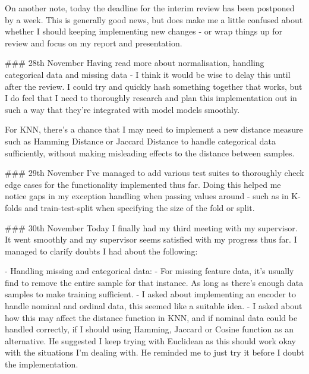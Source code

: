 \documentclass[letterpaper,10pt]{article}
\begin{document}
\begin{markdown}
On another note, today the deadline for the interim review has been postponed by a week. This is generally good news, but does make me a little confused about whether I should keeping implementing new changes - or wrap things up for review and focus on my report and presentation.

### 28th November
Having read more about normalisation, handling categorical data and missing data - I think it would be wise to delay this until after the review. I could try and quickly hash something together that works, but I do feel that I need to thoroughly research and plan this implementation out in such a way that they're integrated with model models smoothly.  
  
For KNN, there's a chance that I may need to implement a new distance measure such as Hamming Distance or Jaccard Distance to handle categorical data sufficiently, without making misleading effects to the distance between samples. 

### 29th November 
I've managed to add various test suites to thoroughly check edge cases for the functionality implemented thus far. Doing this helped me notice gaps in my exception handling when passing values around - such as in K-folds and train-test-split when specifying the size of the fold or split. 

### 30th November
Today I finally had my third meeting with my supervisor. It went smoothly and my supervisor seems satisfied with my progress thus far. I managed to clarify doubts I had about the following:  
  
- Handling missing and categorical data:
    - For missing feature data, it's usually find to remove the entire sample for that instance. As long as there's enough data samples to make training sufficient.  
     - I asked about implementing an encoder to handle nominal and ordinal data, this seemed like a suitable idea.  
    - I asked about how this may affect the distance function in KNN, and if nominal data could be handled correctly, if I should using Hamming, Jaccard or Cosine function as an alternative. He suggested I keep trying with Euclidean as this should work okay with the situations I'm dealing with. He reminded me to just try it before I doubt the implementation.


\end{markdown}
\end{document}
